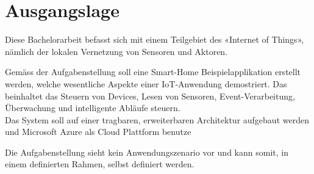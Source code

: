 \section{Ausgangslage}
Diese Bachelorarbeit befasst sich mit einem Teilgebiet des «Internet of Things», nämlich der lokalen Vernetzung von Sensoren und Aktoren.

Gemäss der Aufgabenstellung soll eine Smart-Home Beispielapplikation erstellt werden, welche wesentliche Aspekte  einer IoT-Anwendung demostriert. Das beinhaltet das Steuern von Devices, Lesen von Sensoren, Event-Verarbeitung, Überwachung und intelligente Abläufe steuern. \\
Das System soll auf einer tragbaren, erweiterbaren Architektur aufgebaut werden und Microsoft Azure als Cloud Plattform benutze

Die Aufgabenstellung sieht kein Anwendungszenario vor und kann somit, in einem definierten Rahmen, selbst definiert werden.


